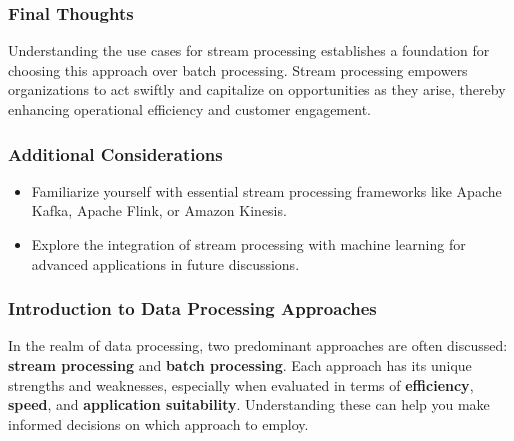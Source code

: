\documentclass{beamer}
\begin{document}
\begin{frame}[fragile]
    \frametitle{Final Thoughts}
    Understanding the use cases for stream processing establishes a foundation for choosing this approach over batch processing. 
    Stream processing empowers organizations to act swiftly and capitalize on opportunities as they arise, 
    thereby enhancing operational efficiency and customer engagement.
\end{frame}

\begin{frame}[fragile]
    \frametitle{Additional Considerations}
    \begin{itemize}
        \item Familiarize yourself with essential stream processing frameworks like Apache Kafka, Apache Flink, or Amazon Kinesis.
        \item Explore the integration of stream processing with machine learning for advanced applications in future discussions.
    \end{itemize}
\end{frame}

\begin{frame}[fragile]
    \frametitle{Introduction to Data Processing Approaches}
    In the realm of data processing, two predominant approaches are often discussed: 
    \textbf{stream processing} and \textbf{batch processing}. Each approach has its unique strengths and weaknesses, especially when evaluated in terms of \textbf{efficiency}, \textbf{speed}, and \textbf{application suitability}. Understanding these can help you make informed decisions on which approach to employ.
\end{frame}
\end{document}
